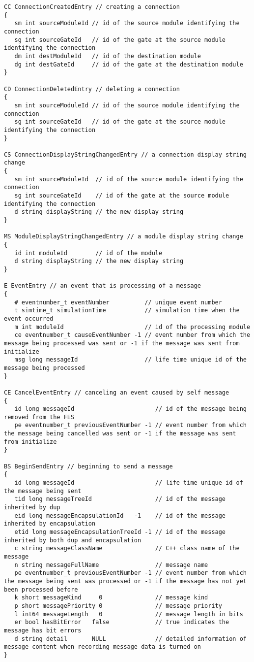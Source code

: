 \begin{verbatim}
CC ConnectionCreatedEntry // creating a connection
{
   sm int sourceModuleId // id of the source module identifying the connection
   sg int sourceGateId   // id of the gate at the source module identifying the connection
   dm int destModuleId   // id of the destination module
   dg int destGateId     // id of the gate at the destination module
}

CD ConnectionDeletedEntry // deleting a connection
{
   sm int sourceModuleId // id of the source module identifying the connection
   sg int sourceGateId   // id of the gate at the source module identifying the connection
}

CS ConnectionDisplayStringChangedEntry // a connection display string change
{
   sm int sourceModuleId  // id of the source module identifying the connection
   sg int sourceGateId    // id of the gate at the source module identifying the connection
   d string displayString // the new display string
}

MS ModuleDisplayStringChangedEntry // a module display string change
{
   id int moduleId        // id of the module
   d string displayString // the new display string
}

E EventEntry // an event that is processing of a message
{
   # eventnumber_t eventNumber          // unique event number
   t simtime_t simulationTime           // simulation time when the event occurred
   m int moduleId                       // id of the processing module
   ce eventnumber_t causeEventNumber -1 // event number from which the message being processed was sent or -1 if the message was sent from initialize
   msg long messageId                   // life time unique id of the message being processed
}

CE CancelEventEntry // canceling an event caused by self message
{
   id long messageId                       // id of the message being removed from the FES
   pe eventnumber_t previousEventNumber -1 // event number from which the message being cancelled was sent or -1 if the message was sent from initialize
}

BS BeginSendEntry // beginning to send a message
{
   id long messageId                       // life time unique id of the message being sent
   tid long messageTreeId                  // id of the message inherited by dup
   eid long messageEncapsulationId   -1    // id of the message inherited by encapsulation
   etid long messageEncapsulationTreeId -1 // id of the message inherited by both dup and encapsulation
   c string messageClassName               // C++ class name of the message
   n string messageFullName                // message name
   pe eventnumber_t previousEventNumber -1 // event number from which the message being sent was processed or -1 if the message has not yet been processed before
   k short messageKind     0               // message kind
   p short messagePriority 0               // message priority
   l int64 messageLength   0               // message length in bits
   er bool hasBitError   false             // true indicates the message has bit errors
   d string detail       NULL              // detailed information of message content when recording message data is turned on
}


\end{verbatim}
